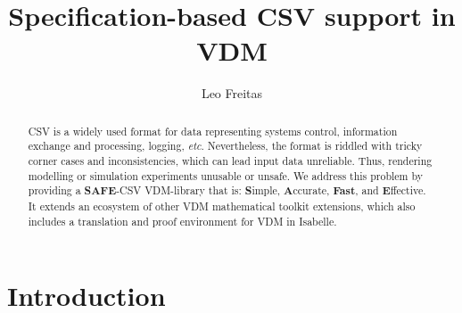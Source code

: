 \documentclass[runningheads,a4paper]{llncs}
\begin{document}
%



\title{Specification-based CSV support in VDM}

\author{Leo Freitas
}
\authorrunning{ }

			
\maketitle
\setcounter{footnote}{0} 
\begin{abstract}
CSV is a widely used format for data representing systems control, information exchange and processing, logging, \textit{etc}. Nevertheless, the format is riddled with tricky corner cases and inconsistencies, which can lead input data unreliable. Thus, rendering modelling or simulation experiments unusable or unsafe. We address this problem by providing a \textbf{SAFE}-CSV VDM-library that is: \textbf{S}imple, \textbf{A}ccurate, \textbf{Fast}, and \textbf{E}ffective. It extends an ecosystem of other VDM mathematical toolkit extensions, which also includes a translation and proof environment for VDM in Isabelle. 
\end{abstract}


\section{Introduction}\label{sec:intro}
\end{document}
